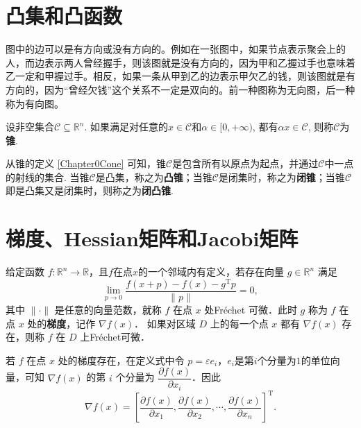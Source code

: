 \section{凸集和凸函数}
图中的边可以是有方向或没有方向的。例如在一张图中，如果节点表示聚会上的人，而边表示两人曾经握手，则该图就是没有方向的，因为甲和乙握过手也意味着乙一定和甲握过手。相反，如果一条从甲到乙的边表示甲欠乙的钱，则该图就是有方向的，因为“曾经欠钱”这个关系不一定是双向的。前一种图称为无向图，后一种称为有向图。

\begin{definition}\label{Chapter0Cone}
    设非空集合$\mathcal{C} \subseteq \mathbb{R}^{n}$. 如果满足对任意的$x \in \mathcal{C}$和$\alpha \in [0,+\infty)$, 都有$\alpha x \in \mathcal{C}$, 则称$\mathcal{C}$为\textbf{锥}.
\end{definition}

从锥的定义 \ref{Chapter0Cone} 可知，锥$\mathcal{C}$是包含所有以原点为起点，并通过$\mathcal{C}$中一点的射线的集合. 当锥$\mathcal{C}$是凸集，称之为\textbf{凸锥}；当锥$\mathcal{C}$是闭集时，称之为\textbf{闭锥}；当锥$\mathcal{C}$即是凸集又是闭集时，则称之为\textbf{闭凸锥}.

\section{梯度、Hessian矩阵和Jacobi矩阵}

\begin{definition}[梯度\index{梯度}]
    给定函数 $f: \mathbb{R}^n \to \mathbb{R}$，且$f$在点$x$的一个邻域内有定义，若存在向量 $g \in \mathbb{R}^n$ 满足
	\begin{equation*}
	   \lim_{p \to 0} \frac{f(x+p) - f(x) - g^{\mathrm{T}} p}{\|p\|} = 0, 
	\end{equation*}
    其中 $\| \cdot \|$ 是任意的向量范数，就称 $f$ 在点 $x$ 处\textup{Fr\'{e}chet} 可微．此时 $g$ 称为 $f$ 在点 $x$ 处的\textbf{梯度}，记作 $\nabla f(x)$．
		如果对区域 $D$ 上的每一个点 $x$ 都有 $\nabla f(x)$ 存在，则称 $f$ 在 $D$ 上\textup{Fr\'{e}chet}可微．
\end{definition}

若 $f$ 在点 $x$ 处的梯度存在，在定义式中令 $p = \varepsilon e_i$，$e_i$是第$i$个分量为$1$的单位向量，可知 $\nabla f(x)$ 的第 $i$ 个分量为 $\dfrac{\partial f(x)}{\partial x_i}$．因此 
	\begin{equation*}
	   \nabla f(x) = \left[ \frac{\partial f(x)}{\partial x_1}, \frac{\partial f(x)}{\partial x_2}, \cdots, \frac{\partial f(x)}{\partial x_n} \right]^{\mathrm{T}}.
	\end{equation*}
 
